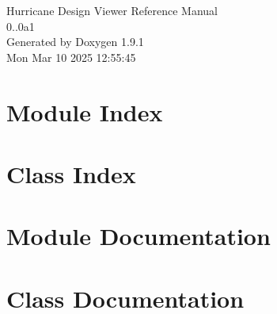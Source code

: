 \documentclass[a4paper]{asimbook}
\begin{document}
   \begin{titlepage}
     \vspace*{7cm}
     \begin{center}
     {\Large Hurricane Design Viewer Reference Manual\\[1ex]\large 0..\+0a1 }\\
     \vspace*{1cm}
     {\large Generated by Doxygen 1.9.1}\\
     \vspace*{0.5cm}
     {\small Mon Mar 10 2025 12:55:45}\\
     \end{center}
   \end{titlepage}

   \clearemptydoublepage

   \tableofcontents
   \clearemptydoublepage

\chapter{Module Index}

\chapter{Class Index}

\chapter{Module Documentation}

\chapter{Class Documentation}








\backmatter
\newpage
{}
\clearemptydoublepage
{}
\printindex
\end{document}
